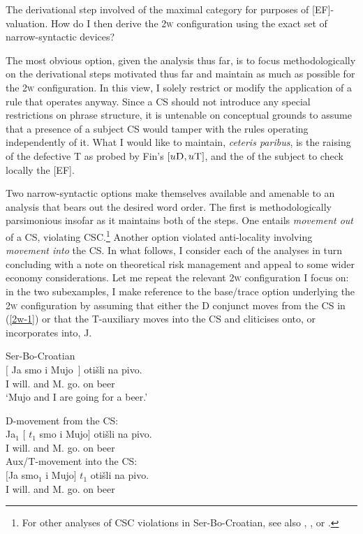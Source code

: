 \documentclass[output=paper]{langsci/langscibook}
\begin{document}
The derivational step involved  of the maximal category for purposes of
[\gls{EF}]-valuation. How do I then derive the \textsc{2w} configuration
using the exact set of narrow-syntactic devices?

The most obvious option, given the analysis thus far, is to focus
methodologically on the derivational steps motivated thus far and maintain as
much as possible for the \textsc{2w} configuration. In this view, I solely
restrict or modify the application of a rule that operates anyway. Since a
\gls{CS} should not introduce any special restrictions on phrase structure, it
is untenable on conceptual grounds to assume that a presence of a subject CS
would tamper with the rules operating independently of it. What I would like to
maintain, \emph{ceteris paribus}, is the raising of the defective T as
probed by Fin's $[u\textsc{D},u\textsc{T}]$, and the  of the
subject to check locally the [\gls{EF}].

Two narrow-syntactic options make themselves available and amenable to an
analysis that bears out the desired word order. The first is methodologically
parsimonious insofar as it maintains both of the  steps. One
entails \emph{movement out} of a CS, violating 
\gls{CSC}.\footnote{For other analyses of CSC violations in
Ser-Bo-Croatian, see also \citet{Stjepanovic:2014},
\citet{Oda:2017}, or \citet{Boskovic2017}.} Another option violated
anti-locality involving  \emph{movement into} the CS. In what
follows, I consider each of the analyses in turn concluding with a note on
theoretical risk management and appeal to some wider economy considerations.
Let me repeat the relevant \textsc{2w} configuration I focus on: in the two
subexamples, I make reference to the base/trace option underlying the
\textsc{2w} configuration by assuming that either the D conjunct moves
from the CS in (\ref{2w-1}) or that the T-auxiliary moves into the CS and
cliticises onto, or incorporates into, J.

\begin{exe}
    \ex Ser-Bo-Croatian\\
    \gll $\big[$ Ja smo i Mujo~$\big]$  otišli na pivo.\\
        {} I will.\Pl{} and M. go.\Ptcp{} on beer \\
	\trans `Mujo and I are going for a beer.'
\begin{xlista}
\ex D-movement from the \gls{CS}:\\
\gll Ja$_1$ $\big[$ $t_1$ smo i Mujo$\big]$  otišli na pivo.\\
    I {} {} will.\Pl{} and M. go.\Ptcp{} on beer \\
\label{2w-1}
\ex Aux/T-movement into the \gls{CS}:\\
 \gll $\big[$Ja smo$_1$ i Mujo$\big]$  $t_1$ otišli na pivo.\\
     \hphantom{$\big[$}I will.\Pl{} and M. {} go.\Ptcp{} on beer \\
\label{2w-2}
\end{xlista}

\end{exe}
\end{document}
